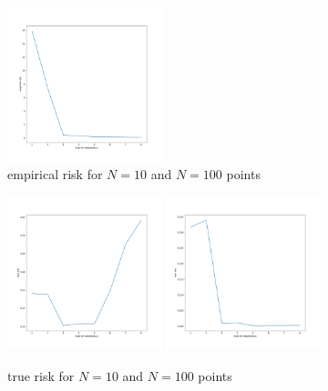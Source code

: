 \documentclass[english]{exercisesheet}
\begin{document}
\begin{solution}
\begin{figure}
  \includegraphics[width=0.4\textwidth]{images/empirical_risk-100.pdf}
  \caption{empirical risk for $N=10$ and $N=100$ points}
  \label{emr}
 \end{figure}
 \begin{figure}
  \includegraphics[width=0.4\textwidth]{images/true_risk-10.pdf}
  \includegraphics[width=0.4\textwidth]{images/true_risk-100.pdf}
  \caption{true risk for $N=10$ and $N=100$ points}
  \label{tr}
 \end{figure}
 \begin{figure}

\end{figure}
\end{solution}
\end{document}
